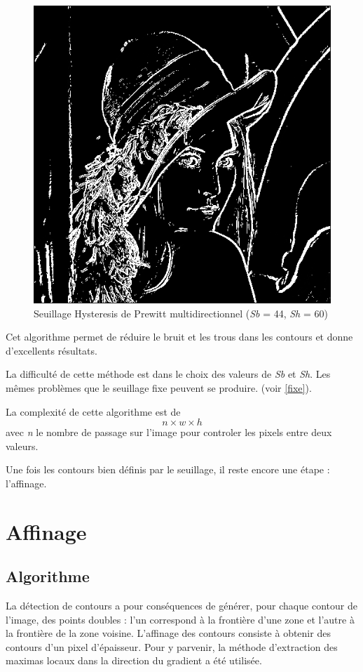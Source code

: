 \documentclass[11pt]{article}
\begin{document}
	\begin{figure}[H]
		\centering
		\includegraphics[scale=0.25]{Image/seuilHysteresis.png}
		\caption{Seuillage Hysteresis de Prewitt multidirectionnel	(\textit{Sb} = 44, \textit{Sh} = 60)}
		\label{fig:seuilHysteresis}
	\end{figure} 



	Cet algorithme permet de réduire le bruit et les trous dans les contours et donne d'excellents résultats.

	La difficulté de cette méthode est dans le choix des valeurs de \textit{Sb} et \textit{Sh}.
	Les mêmes problèmes que le seuillage fixe peuvent se produire. (voir \ref{fixe}).

	La complexité de cette algorithme est de \[n \times w \times h\]
	avec \textit{n} le nombre de passage sur l'image pour controler les pixels entre deux valeurs.

	Une fois les contours bien définis par le seuillage, il reste encore une étape : l'affinage.


\section{Affinage}

	\subsection{Algorithme}
		La détection de contours a pour conséquences de générer, pour chaque contour de l'image, des points doubles : l'un correspond à la frontière d'une zone et l'autre à la frontière de la zone voisine. 
		L'affinage des contours consiste à obtenir des contours d'un pixel d'épaisseur. 
		Pour y parvenir, la méthode d'extraction des maximas locaux dans la direction du gradient a été utilisée.
\end{document}
